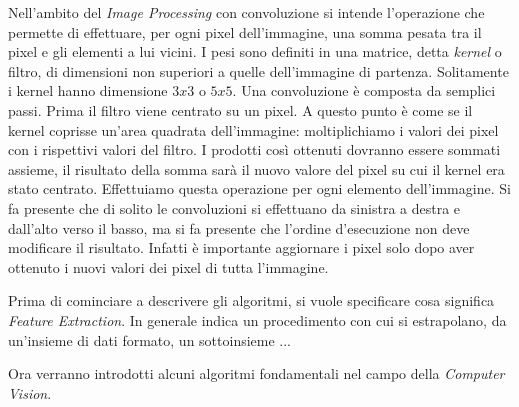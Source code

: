Nell'ambito del \textit{Image Processing} con convoluzione si intende l'operazione che permette di effettuare, per ogni pixel dell'immagine, una somma pesata tra il pixel e gli elementi a lui vicini.
I pesi sono definiti in una matrice, detta \textit{kernel} o filtro, di dimensioni non superiori a quelle dell'immagine di partenza.
Solitamente i kernel hanno dimensione $3x3$ o $5x5$.%
Una convoluzione è composta da semplici passi.
Prima il filtro viene centrato su un pixel.
A questo punto è come se il kernel coprisse un'area quadrata dell'immagine: moltiplichiamo i valori dei pixel con i rispettivi valori del filtro.
I prodotti così ottenuti dovranno essere sommati assieme, il risultato della somma sarà il nuovo valore del pixel su cui il kernel era stato centrato.
Effettuiamo questa operazione per ogni elemento dell'immagine.
Si fa presente che di solito le convoluzioni si effettuano da sinistra a destra e dall'alto verso il basso, ma si fa presente che l'ordine d'esecuzione non deve modificare il risultato.
Infatti è importante aggiornare i pixel solo dopo aver ottenuto i nuovi valori dei pixel di tutta l'immagine.

Prima di cominciare a descrivere gli algoritmi, si vuole specificare cosa significa \textit{Feature Extraction}.
In generale indica un procedimento con cui si estrapolano, da un'insieme di dati formato,  un sottoinsieme ...



\clearpage
Ora verranno introdotti alcuni algoritmi fondamentali nel campo della \textit{Computer Vision}.




